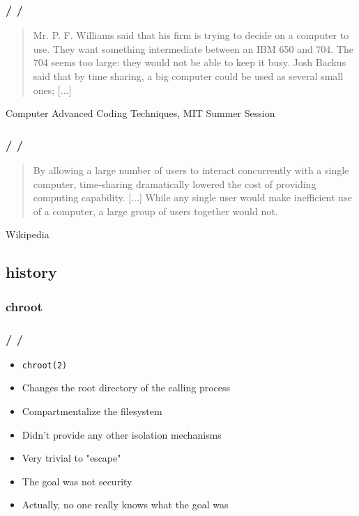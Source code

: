 \documentclass{beamer}
\newcommand{\autotitle}
{\frametitle{
    \secname
    \ifx\insertsubsection\empty
    \else
        /\subsecname
        \ifx\insertsubsubsection\empty\else/\subsubsecname\fi
    \fi}}
\begin{document}
\begin{frame}
    \autotitle
    \begin{quote}
        Mr. P. F. Williams said that his firm is trying to decide on a
        computer to use.  They want something intermediate between an
        IBM 650 and 704.  The 704 seems too large: they would not be
        able to keep it busy.  Josh Backus said that by time sharing, a
        big computer could be used as several small ones; [...]
    \end{quote}
    Computer Advanced Coding Techniques, MIT Summer Session
    \cite{mit_summer_session}
\end{frame}

\begin{frame}
    \autotitle
    \begin{quote}
        By allowing a large number of users to interact concurrently with a
        single computer, time-sharing dramatically lowered the cost of
        providing computing capability.  [...] While any single user would make
        inefficient use of a computer, a large group of users together would
        not.
    \end{quote}
    Wikipedia \cite{wikipedia_time_sharing}
\end{frame}

\subsection{history}

\subsubsection{chroot}

\begin{frame}
    \autotitle
    \begin{itemize}
        \item \texttt{chroot(2)}
        \item Changes the root directory of the calling process
        \item Compartmentalize the filesystem
        \item Didn't provide any other isolation mechanisms
        \item Very trivial to "escape"
        \item The goal was not security
        \item Actually, no one really knows what the goal was
    \end{itemize}
\end{frame}
\end{document}
